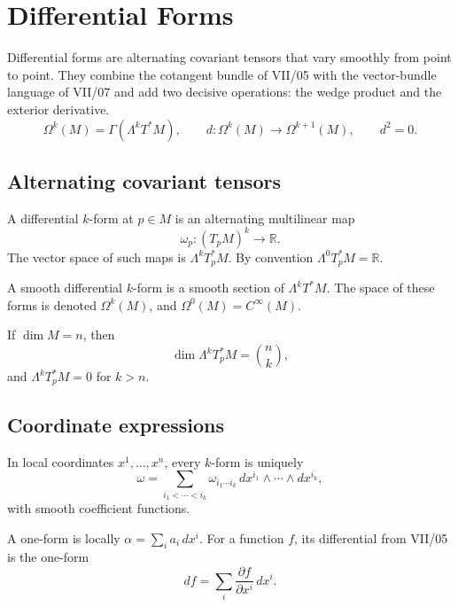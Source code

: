 \chapter{Differential Forms}
\label{ch:vii09-differential-forms}

Differential forms are alternating covariant tensors that vary smoothly from point to point. They combine the cotangent bundle of VII/05 with the vector-bundle language of VII/07 and add two decisive operations: the wedge product and the exterior derivative.
\[
\boxed{\Omega^k(M)=\Gamma(\Lambda^kT^*M),\qquad
d:\Omega^k(M)\to\Omega^{k+1}(M),\qquad d^2=0.}
\]

\section{Alternating covariant tensors}
\begin{definition}\label{def:vii09-point-form}
A differential \(k\)-form at \(p\in M\) is an alternating multilinear map
\[
\omega_p:(T_pM)^k\to\mathbb R.
\]
The vector space of such maps is \(\Lambda^kT_p^*M\). By convention \(\Lambda^0T_p^*M=\mathbb R\).
\end{definition}

\begin{definition}\label{def:vii09-smooth-form}
A smooth differential \(k\)-form is a smooth section of \(\Lambda^kT^*M\). The space of these forms is denoted \(\Omega^k(M)\), and \(\Omega^0(M)=C^\infty(M)\).
\end{definition}

\begin{proposition}[Dimension]\label{prop:vii09-dim}
If \(\dim M=n\), then
\[
\dim\Lambda^kT_p^*M=\binom nk,
\]
and \(\Lambda^kT_p^*M=0\) for \(k>n\).
\end{proposition}

\section{Coordinate expressions}
In local coordinates \(x^1,\ldots,x^n\), every \(k\)-form is uniquely
\[
\omega=\sum_{i_1<\cdots<i_k}\omega_{i_1\cdots i_k}
\,dx^{i_1}\wedge\cdots\wedge dx^{i_k},
\]
with smooth coefficient functions.

\begin{example}\label{ex:vii09-one-forms}
A one-form is locally \(\alpha=\sum_i a_i\,dx^i\). For a function \(f\), its differential from VII/05 is the one-form
\[
df=\sum_i\frac{\partial f}{\partial x^i}\,dx^i.
\]
\end{example}

